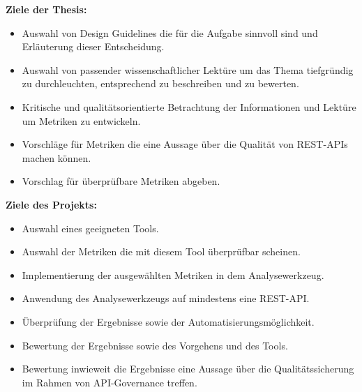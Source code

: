 \documentclass[../../expose]{subfiles}
\begin{document}
\textbf{Ziele der Thesis:}
\begin{itemize}
\item Auswahl von Design Guidelines die für die Aufgabe sinnvoll sind und Erläuterung dieser Entscheidung.
\item Auswahl von passender wissenschaftlicher Lektüre um das Thema tiefgründig zu durchleuchten, entsprechend zu beschreiben und zu bewerten.
\item Kritische und qualitätsorientierte Betrachtung der Informationen und Lektüre um Metriken zu entwickeln.
\item Vorschläge für Metriken die eine Aussage über die Qualität von REST-APIs machen können.
\item Vorschlag für überprüfbare Metriken abgeben. \newline
\end{itemize} 



\textbf{Ziele des Projekts:}
\begin{itemize}
\item Auswahl eines geeigneten Tools.
\item Auswahl der Metriken die mit diesem Tool überprüfbar scheinen.
\item Implementierung der ausgewählten Metriken in dem Analysewerkzeug.
\item Anwendung des Analysewerkzeugs auf mindestens eine REST-API.
\item Überprüfung der Ergebnisse sowie der Automatisierungsmöglichkeit.
\item Bewertung der Ergebnisse sowie des Vorgehens und des Tools.
\item Bewertung inwieweit die Ergebnisse eine Aussage über die Qualitätssicherung im Rahmen von API-Governance treffen. \newline
\end{itemize}
\end{document}
